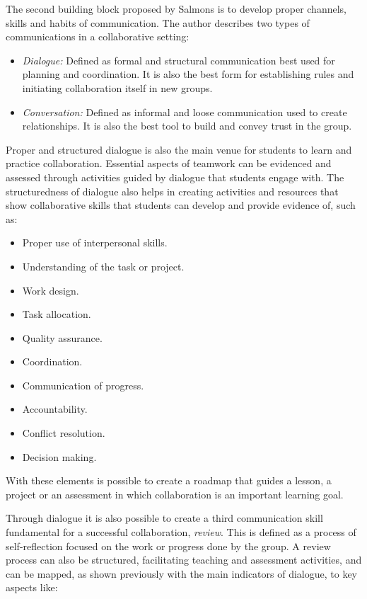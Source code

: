The second building block proposed by Salmons is to develop proper channels, skills and habits of communication. The author describes two types of communications in a collaborative setting:

\begin{itemize}
    \item \emph{Dialogue:} Defined as formal and structural communication best used for planning and coordination. It is also the best form for establishing rules and initiating collaboration itself in new groups.
    \item \emph{Conversation:} Defined as informal and loose communication used to create relationships. It is also the best tool to build and convey trust in the group.
\end{itemize}

Proper and structured dialogue is also the main venue for students to learn and practice collaboration. Essential aspects of teamwork can be evidenced and assessed through activities guided by dialogue that students engage with. The structuredness of dialogue also
helps in creating activities and resources that show collaborative skills that students can develop and provide evidence of, such as:

\begin{itemize}
    \item Proper use of interpersonal skills.
    \item Understanding of the task or project.
    \item Work design.
    \item Task allocation.
    \item Quality assurance.
    \item Coordination.
    \item Communication of progress.
    \item Accountability.
    \item Conflict resolution.
    \item Decision making.
\end{itemize}

With these elements is possible to create a roadmap that guides a lesson, a project or an assessment in which collaboration is an important learning goal.

Through dialogue it is also possible to create a third communication skill fundamental for a successful collaboration, \emph{review}. This is defined as a process of self-reflection focused on the work or progress done by the group. A review process can also be structured,
facilitating teaching and assessment activities, and can be mapped, as shown previously with the main indicators of dialogue, to key aspects like:

